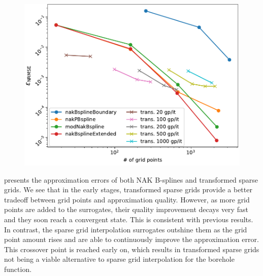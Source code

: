 \documentclass[
  a4paper,  %
  twoside,  %
  bibliography=totoc,
  headsepline,
  cleardoublepage=empty,
  parskip=half,
  draft=false
]{scrbook}
\begin{document}
\begin{mdframed}[style=style]
\begin{figure}[H]
\includegraphics[width=\textwidth]{graphics/borehole}
\delimit
{}
\label{fig:borehole_comp}
\end{figure}
\end{mdframed}
%
 presents the approximation errors of both NAK B-splines and transformed sparse grids.
We see that in the early stages, transformed sparse grids provide a better tradeoff between grid points and approximation quality.
However, as more grid points are added to the surrogates, their quality improvement decays very fast and they soon reach a convergent state.
This is consistent with previous results.
In contrast, the sparse grid interpolation surrogates outshine them as the grid point amount rises and are able to continuously improve the approximation error.
This crossover point is reached early on, which results in transformed sparse grids not being a viable alternative to sparse grid interpolation for the borehole function.
\end{document}
